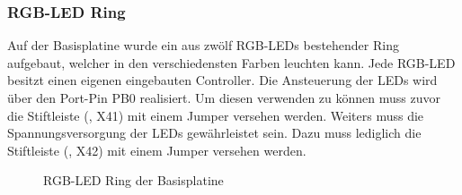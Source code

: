 \subsubsection{RGB-LED Ring \cite{basis:ws2812b}}
Auf der \gls{Basisplatine} wurde ein aus zwölf RGB-LEDs bestehender Ring aufgebaut, welcher in den verschiedensten Farben leuchten kann. Jede RGB-LED besitzt einen eigenen eingebauten Controller. Die Ansteuerung der LEDs wird über den Port-Pin PB0 realisiert. Um diesen verwenden zu können muss zuvor die Stiftleiste (, X41) mit einem Jumper versehen werden. Weiters muss die Spannungsversorgung der LEDs gewährleistet sein. Dazu muss lediglich die Stiftleiste (, X42) mit einem Jumper versehen werden.

\begin{figure}[htb]
    \centering
    \qquad
    \qquad
    \caption[RGB-LED Ring der Basisplatine]{RGB-LED Ring der \gls{Basisplatine}}
    \label{fig:basisplatine-ledring}
\end{figure}

